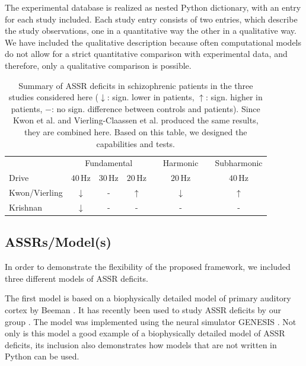 \documentclass[a4paper,10pt]{article}
\begin{document}
The experimental database is realized as nested Python dictionary, with an entry for each study included.
Each study entry consists of two entries, which describe the study observations, one in a quantitative way the other in a qualitative way.
We have included the qualitative description because often computational models do not allow for a strict quantitative comparison with 
experimental data, and therefore, only a qualitative comparison is possible. 

\begin{table}[h!]
\centering
\label{Tab:Experiments} 
\caption{Summary of ASSR deficits in schizophrenic patients in the three studies considered here ($\downarrow$: sign. lower in patients, $\uparrow$: sign. higher in patients, $-$: no sign. difference between controls and patients). Since Kwon et al. \cite{Kwon1999} and Vierling-Claassen et al. \cite{Vierling2008}
produced the same results, they are combined here. Based on this table, we designed the capabilities and tests.}
\begin{tabular}{lccccccc}\toprule
& \multicolumn{3}{c}{Fundamental}& \phantom{a} & Harmonic & \phantom{a} & Subharmonic \\
\cmidrule{2-4} \cmidrule{6-6} \cmidrule{8-8}
Drive& $40$\,Hz  & $30$\,Hz  & $20$\,Hz&  & $20$\,Hz & &$40$\,Hz \\
\midrule 
Kwon/Vierling & $\downarrow$& -& $\uparrow$& &$\downarrow$ & & $\uparrow$\\ \addlinespace

Krishnan & $\downarrow$& -& -& &- & &- \\
\bottomrule
\end{tabular}
\end{table}


\subsection{ASSRs/Model(s)}
In order to demonstrate the flexibility of the proposed framework,  we included three different models of ASSR deficits.

The first model is based on a biophysically detailed model of primary auditory cortex by Beeman \cite{Beeman2013}. It has recently been used to study 
ASSR deficits by our group \cite{Metzner2016}. The model was implemented using the neural simulator GENESIS \cite{Bower????}. Not only is this model
a good example of a biophysically detailed model of ASSR deficits, its inclusion also demonstrates how models that are not written in Python can be used.
\end{document}
